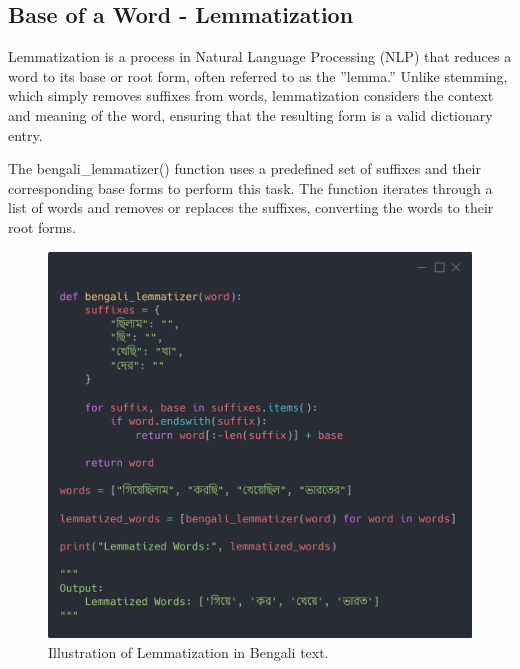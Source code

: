 \subsection{Base of a Word - Lemmatization}

\cite{InfosysNLP:1}Lemmatization is a process in Natural Language Processing (NLP) that reduces a word to its base or root form, often referred to as the ”lemma.” Unlike stemming, which simply removes suffixes from words, lemmatization considers the context and meaning of the word, ensuring that the resulting form is a valid dictionary entry.

The bengali\_lemmatizer() function uses a predefined set of suffixes and their corresponding base forms to perform this task. The function iterates through a list of words and removes or replaces the suffixes, converting the words to their root forms.

\begin{figure}[H]
    \centering
    \includegraphics[width=0.8\linewidth]{Attachments/Figures/base-of-a-word_figure1.png}
    \caption{Illustration of Lemmatization in Bengali text.}
\end{figure}
